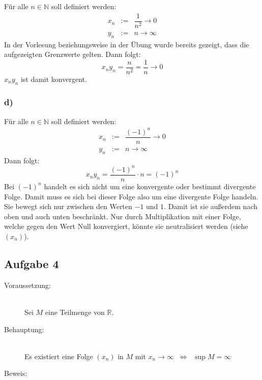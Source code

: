 \documentclass[10pt, a4paper]{article}
\begin{document}
			Für alle $n \in \mathbb{N}$ soll definiert werden:
			\begin{eqnarray*}
				x_n &:=& \dfrac{1}{n^2} \longrightarrow 0 \\
				y_n &:=& n \longrightarrow \infty
			\end{eqnarray*}
			In der Vorlesung beziehungsweise in der Übung wurde bereits gezeigt, dass die aufgezeigten Grenzwerte gelten. Dann folgt:
			\[
				x_ny_n = \dfrac{n}{n^2} = \dfrac{1}{n} \longrightarrow 0
			\]
			$x_ny_n$ ist damit konvergent.


		\subsubsection*{d)} %
		\label{ssub:d_}
		
			Für alle $n \in \mathbb{N}$ soll definiert werden:
			\begin{eqnarray*}
				x_n &:=& \dfrac{(-1)^n}{n} \longrightarrow 0 \\
				y_n &:=& n \longrightarrow \infty
			\end{eqnarray*}
			Dann folgt:
			\[
				x_ny_n = \dfrac{(-1)^n}{n}\cdot n = (-1)^n 
			\]
			Bei $(-1)^n$ handelt es sich nicht um eine konvergente oder bestimmt divergente Folge. Damit muss es sich bei dieser Folge also um eine divergente Folge handeln. Sie bewegt sich nur zwischen den Werten $-1$ und $1$. Damit ist sie außerdem nach oben und auch unten beschränkt. Nur durch Multiplikation mit einer Folge, welche gegen den Wert Null konvergiert, könnte sie neutralisiert werden (siehe $(x_n)$).



	\newpage

	\subsection*{Aufgabe 4} %
	\label{sub:aufgabe_4}
	
		\begin{description}
			\item[Voraussetzung:] \hfill \\
				Sei $M$ eine Teilmenge von $\mathbb{R}$.
			\item[Behauptung:] \hfill \\
				Es existiert eine Folge $(x_n)$ in $M$ mit $x_n \longrightarrow \infty$  $\ \Leftrightarrow \ $ $\sup M = \infty$ 
			\item[Beweis:]
		\end{description}
		
\end{document}
